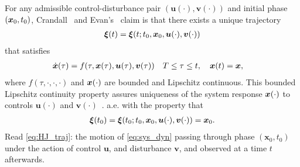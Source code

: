 For any admissible control-disturbance pair $(\bm{u}(\cdot), \bm{v}(\cdot))$ and initial phase $(\bm{x}_0, t_0)$, Crandall~\cite{Crandall1983viscosity} and Evan's~\cite{Evans1984} claim is that there exists a unique trajectory %
%
\begin{align}
	\bm{\xi}(t) = \bm{\xi}(t; t_0, \bm{x}_0, \bm{u}(\cdot), \bm{v}(\cdot))
	\label{eq:HJ_traj}
\end{align}
%
that satisfies 
%
\begin{subequations}
	\begin{align}
		\dot{\bm{x}}(\tau) &= f(\tau, \bm{x}(\tau), \bm{u}(\tau), \bm{v}(\tau)) \quad T \le \tau \le t, \quad \bm{x}(t) = \bm{x},
	\end{align}
	\label{eq:sys_dyn}
\end{subequations}
%
\noindent where $f(\tau, \cdot, \cdot, \cdot)$ and $\bm{x}(\cdot)$ are bounded and Lipschitz continuous. This bounded Lipschitz continuity property assures uniqueness of the system response $\bm{x}(\cdot)$ to controls $\bm{u}(\cdot)$ and $\bm{v}(\cdot)$~\cite{Souganidis}. 
%
a.e. with the property that
%
\begin{align}
	\bm{\xi}(t_0) = \bm{\xi}(t_0; t_0, \bm{x}_0, \bm{u}(\cdot), \bm{v}(\cdot)) = \bm{x}_0.
\end{align}
%
Read \eqref{eq:HJ_traj}: the motion of \eqref{eq:sys_dyn} passing through phase $(\bm{x}_0, t_0)$ under the action of control $\bm{u}$, and disturbance $\bm{v}$, and observed at a time $t$ afterwards. 

